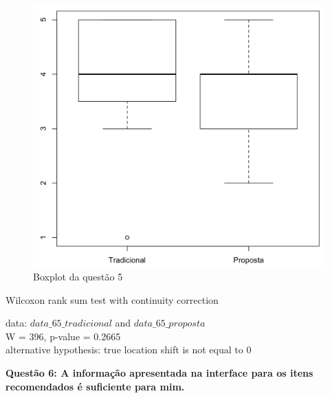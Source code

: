 \begin{figure}[htb]
  \caption{\label{fig:questao5-boxplot}Boxplot da questão 5}
  \begin{center}
      \includegraphics[scale=0.6]{./Figuras/questao5-boxplot.png}
  \end{center}
\end{figure}

Wilcoxon rank sum test with continuity correction

data:  $data\_65\_tradicional$ and $data\_65\_proposta$\\
W = 396, p-value = 0.2665\\
alternative hypothesis: true location shift is not equal to 0

\newpage
\textbf{Questão 6: A informação apresentada na interface para os itens recomendados é suficiente para mim.}

